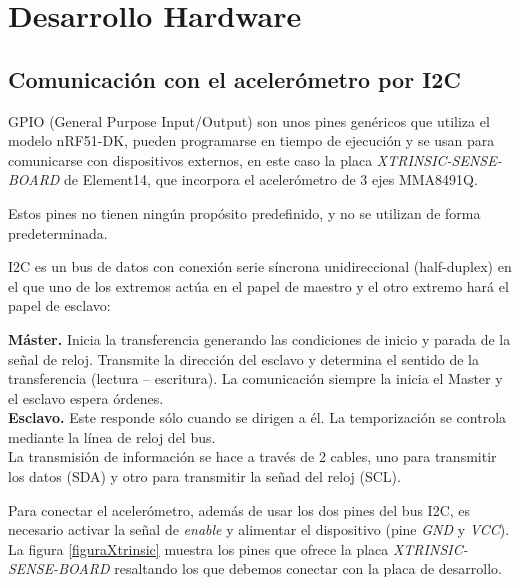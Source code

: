 \cleardoublepage

\chapter{Desarrollo Hardware}
\label{makereference5}

\section{Comunicación con el acelerómetro por I2C}
\label{makereference5.1}

GPIO (General Purpose Input/Output) son unos pines genéricos que utiliza el modelo nRF51-DK, pueden programarse en tiempo de ejecución y se usan para comunicarse con dispositivos externos, en este caso la placa  \emph{XTRINSIC-SENSE-BOARD} de Element14, que incorpora el acelerómetro de 3 ejes MMA8491Q.

Estos pines no tienen ningún propósito predefinido, y no se utilizan de forma predeterminada.

I2C es un bus de datos con conexión serie síncrona unidireccional (half-duplex) en el que uno de los extremos actúa en el papel de maestro y el otro extremo hará el papel de esclavo:

\textbf{Máster.} Inicia la transferencia generando las condiciones de inicio y parada de la señal de reloj. Transmite la dirección del esclavo y determina el sentido de la transferencia (lectura –
escritura). La comunicación siempre la inicia el Master y el esclavo espera órdenes.\\

\textbf{Esclavo.} Este responde sólo cuando se dirigen a él. La temporización se controla mediante la línea de reloj del bus.\\

La transmisión de información se hace a través de 2 cables, uno para transmitir los datos (SDA) y otro para transmitir la señad del reloj (SCL). 

Para conectar el acelerómetro, además de usar los dos pines del bus I2C, es necesario activar la señal de \emph{enable} y alimentar el dispositivo (pine \emph{GND} y \emph{VCC}). La figura \ref{figuraXtrinsic} muestra los pines que ofrece la placa  \emph{XTRINSIC-SENSE-BOARD} resaltando los que debemos conectar con la placa de desarrollo.

